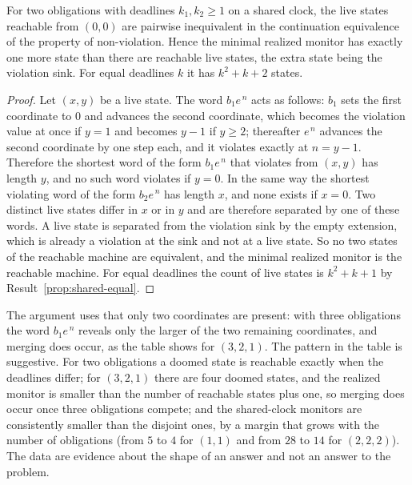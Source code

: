 \begin{newresult}\label{prop:shared-two-minimal}
For two obligations with deadlines $k_1,k_2\ge1$ on a shared clock, the live states reachable from $(0,0)$ are pairwise inequivalent in the continuation equivalence of the property of non-violation. Hence the minimal realized monitor has exactly one more state than there are reachable live states, the extra state being the violation sink. For equal deadlines $k$ it has $k^{2}+k+2$ states.
\end{newresult}
\begin{proof}
Let $(x,y)$ be a live state. The word $b_1e^{\,n}$ acts as follows: $b_1$ sets the first coordinate to $0$ and advances the second coordinate, which becomes the violation value at once if $y=1$ and becomes $y-1$ if $y\ge2$; thereafter $e^{\,n}$ advances the second coordinate by one step each, and it violates exactly at $n=y-1$. Therefore the shortest word of the form $b_1e^{\,n}$ that violates from $(x,y)$ has length $y$, and no such word violates if $y=0$. In the same way the shortest violating word of the form $b_2e^{\,n}$ has length $x$, and none exists if $x=0$. Two distinct live states differ in $x$ or in $y$ and are therefore separated by one of these words. A live state is separated from the violation sink by the empty extension, which is already a violation at the sink and not at a live state. So no two states of the reachable machine are equivalent, and the minimal realized monitor is the reachable machine. For equal deadlines the count of live states is $k^{2}+k+1$ by Result~\ref{prop:shared-equal}.
\end{proof}

The argument uses that only two coordinates are present: with three obligations the word $b_1e^{\,n}$ reveals only the larger of the two remaining coordinates, and merging does occur, as the table shows for $(3,2,1)$. The pattern in the table is suggestive. For two obligations a doomed state is reachable exactly when the deadlines differ; for $(3,2,1)$ there are four doomed states, and the realized monitor is smaller than the number of reachable states plus one, so merging does occur once three obligations compete; and the shared-clock monitors are consistently smaller than the disjoint ones, by a margin that grows with the number of obligations (from $5$ to $4$ for $(1,1)$ and from $28$ to $14$ for $(2,2,2)$). The data are evidence about the shape of an answer and not an answer to the problem.

